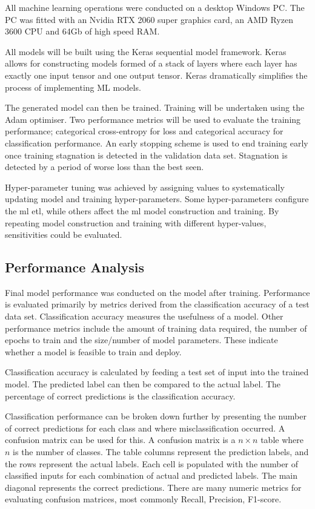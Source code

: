 All machine learning operations were conducted on a desktop Windows PC. The PC was fitted with an Nvidia RTX 2060 super graphics card, an AMD Ryzen 3600 CPU and 64Gb of high speed RAM.

All models will be built using the Keras sequential model framework. Keras allows for constructing models formed of a stack of layers where each layer has exactly one input tensor and one output tensor. Keras dramatically simplifies the process of implementing ML models.

The generated model can then be trained. Training will be undertaken using the Adam optimiser\cite{Kingma2015}. Two performance metrics will be used to evaluate the training performance; categorical cross-entropy for loss and categorical accuracy for classification performance. An early stopping scheme is used to end training early once training stagnation is detected in the validation data set. Stagnation is detected by a period of worse loss than the best seen.

Hyper-parameter tuning was achieved by assigning values to systematically updating model and training hyper-parameters. Some hyper-parameters configure the \acrshort{ml} \acrshort{etl}, while others affect the \acrshort{ml} model construction and training. By repeating model construction and training with different hyper-values, sensitivities could be evaluated.

\subsection{Performance Analysis}
Final model performance was conducted on the model after training. Performance is evaluated primarily by metrics derived from the classification accuracy of a test data set. Classification accuracy measures the usefulness of a model. Other performance metrics include the amount of training data required, the number of epochs to train and the size/number of model parameters. These indicate whether a model is feasible to train and deploy.

Classification accuracy is calculated by feeding a test set of input into the trained model. The predicted label can then be compared to the actual label. The percentage of correct predictions is the classification accuracy.

Classification performance can be broken down further by presenting the number of correct predictions for each class and where misclassification occurred. A confusion matrix can be used for this. A confusion matrix is a $n\times n$ table where $n$ is the number of classes. The table columns represent the prediction labels, and the rows represent the actual labels. Each cell is populated with the number of classified inputs for each combination of actual and predicted labels. The main diagonal represents the correct predictions. There are many numeric metrics for evaluating confusion matrices, most commonly Recall, Precision, F1-score.
